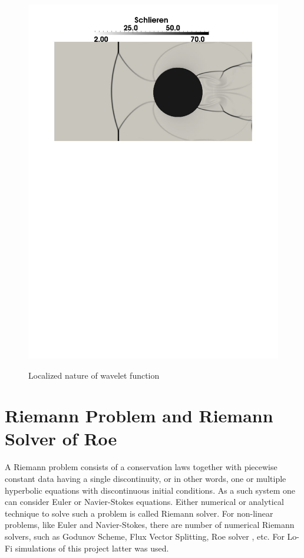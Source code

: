 \begin{figure}[h!]
\begin{minipage}{0.5\linewidth}
\includegraphics[scale=0.4]{fig/visc_sch.pdf}\\
\end{minipage}
\caption{Localized nature of wavelet function} \label{fig:visc}
\end{figure}

\section{Riemann Problem and Riemann Solver of Roe}
A Riemann problem consists of a conservation laws together with piecewise constant data having a single discontinuity, or in other words, one or multiple hyperbolic equations with discontinuous initial conditions. As a such system one can consider Euler or Navier-Stokes equations. Either numerical or analytical technique to solve such a problem is called Riemann solver. For non-linear problems, like Euler and Navier-Stokes, there are number of numerical Riemann solvers, such as Godunov Scheme, Flux Vector Splitting, Roe solver \cite{book:Toro}, etc. For Lo-Fi simulations of this project latter was used.

